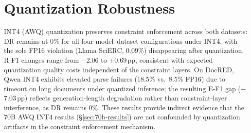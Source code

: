 
\section{Quantization Robustness}
\label{app:quantization}

\begin{table}[h]
\centering
\small
\setlength{\tabcolsep}{3.2pt}
\caption{FP16 vs.\ INT4 (AWQ) quantization under LoRA + S1 on SciERC and DocRED. F1 $\times$ 100; PF = parse-failure rate.
\textsuperscript{\dag}Qwen DocRED FP16 evaluated on 998 docs (all other configurations use matched subsets).
\textsuperscript{\ddag}E-F1 drop primarily attributable to increased parse failures under INT4 quantization on long documents rather than constraint interference (DR remains 0\%).}
\label{tab:quantization}
\end{table}

INT4 (AWQ) quantization preserves constraint enforcement across both datasets: DR remains at 0\% for all four model--dataset configurations under INT4, with the sole FP16 violation (Llama SciERC, 0.09\%) disappearing after quantization.
R-F1 changes range from $-$2.06 to $+$0.69\,pp, consistent with expected quantization quality costs independent of the constraint layers.
On DocRED, Qwen INT4 exhibits elevated parse failures (18.5\% vs.\ 8.5\% FP16) due to timeout on long documents under quantized inference; the resulting E-F1 gap ($-$7.03\,pp) reflects generation-length degradation rather than constraint-layer interference, as DR remains 0\%.
These results provide indirect evidence that the 70B AWQ INT4 results (\S\ref{sec:70b-results}) are not confounded by quantization artifacts in the constraint enforcement mechanism.

